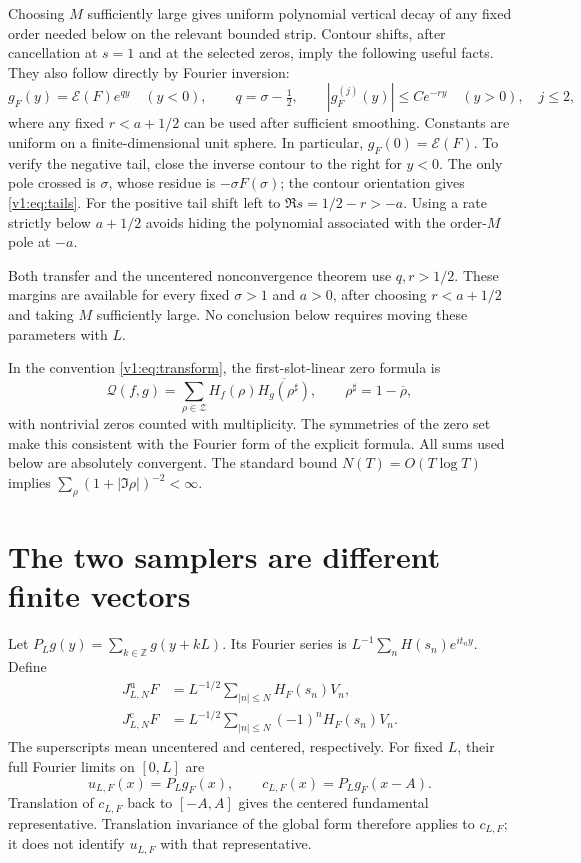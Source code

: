\documentclass[11pt]{article}
\theoremstyle{remark}
\newcommand{\Q}{\mathcal Q}
\newcommand{\Jc}{J^{\mathrm c}}
\newcommand{\Ju}{J^{\mathrm u}}
\newcommand{\E}{\mathscr E}
\newcommand{\Z}{\mathcal Z}
\begin{document}
Choosing $M$ sufficiently large gives uniform polynomial vertical decay
of any fixed order needed below on the relevant bounded strip. Contour
shifts, after cancellation at $s=1$ and at the selected zeros, imply the
following useful facts. They also follow directly by Fourier inversion:
\begin{equation}\label{v1:eq:tails}
 g_F(y)=\E(F)e^{qy}\quad(y<0),\qquad q=\sigma-\tfrac12,
 \qquad |g_F^{(j)}(y)|\le C e^{-ry}\quad(y>0),\quad j\le2,
\end{equation}
where any fixed $r<a+1/2$ can be used after sufficient smoothing.
Constants are uniform on a finite-dimensional unit sphere. In particular,
$g_F(0)=\E(F)$. To verify the negative tail, close the inverse contour to
the right for $y<0$. The only pole crossed is $\sigma$, whose residue is
$-\sigma F(\sigma)$; the contour orientation gives \eqref{v1:eq:tails}.
For the positive tail shift left to $\Re s=1/2-r>-a$.
Using a rate strictly below $a+1/2$ avoids hiding the polynomial associated
with the order-$M$ pole at $-a$.

Both transfer and the uncentered nonconvergence theorem use $q,r>1/2$.
These margins are available for every fixed $\sigma>1$ and $a>0$, after
choosing $r<a+1/2$ and taking $M$ sufficiently large. No conclusion below
requires moving these parameters with $L$.

In the convention \eqref{v1:eq:transform}, the first-slot-linear zero formula is
\begin{equation}\label{v1:eq:zeros}
 \Q(f,g)=\sum_{\rho\in\Z}
 H_f(\rho)\overline{H_g(\rho^\sharp)},
 \qquad \rho^\sharp=1-\overline\rho,
\end{equation}
with nontrivial zeros counted with multiplicity. The symmetries of the
zero set make this consistent with the Fourier form of the explicit
formula. All sums used below are absolutely convergent. The standard
bound $N(T)=O(T\log T)$ implies
$\sum_{\rho}(1+|\Im\rho|)^{-2}<\infty$.

\section{The two samplers are different finite vectors}

Let $P_Lg(y)=\sum_{k\in\mathbb Z}g(y+kL)$. Its Fourier series is
$L^{-1}\sum_n H(s_n)e^{it_ny}$. Define
\begin{align}
 \Ju_{L,N}F&=L^{-1/2}\sum_{|n|\le N}H_F(s_n)V_n,
       \label{v1:eq:raw}\\
 \Jc_{L,N}F&=L^{-1/2}\sum_{|n|\le N}(-1)^nH_F(s_n)V_n.
       \label{v1:eq:centered}
\end{align}
The superscripts mean uncentered and centered, respectively.
For fixed $L$, their full Fourier limits on $[0,L]$ are
\[
 u_{L,F}(x)=P_Lg_F(x),\qquad
 c_{L,F}(x)=P_Lg_F(x-A).
\]
Translation of $c_{L,F}$ back to $[-A,A]$ gives the centered fundamental
representative. Translation invariance of the global form therefore
applies to $c_{L,F}$; it does not identify $u_{L,F}$ with that representative.
\end{document}
